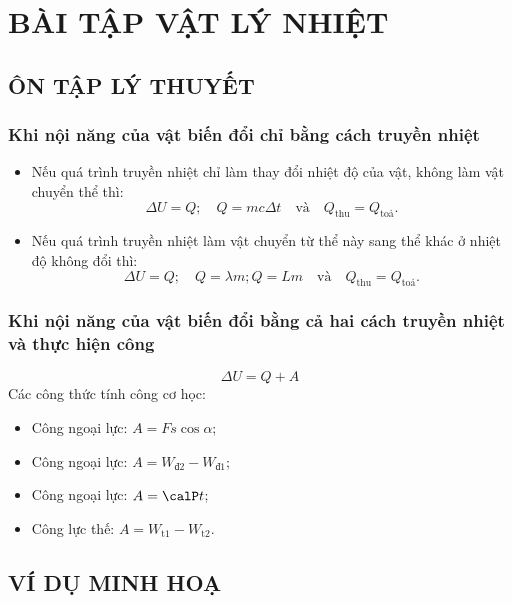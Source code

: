 \section{BÀI TẬP VẬT LÝ NHIỆT}
\subsection{ÔN TẬP LÝ THUYẾT}
\subsubsection{Khi nội năng của vật biến đổi chỉ bằng cách truyền nhiệt}
\begin{itemize}
	\item Nếu quá trình truyền nhiệt chỉ làm thay đổi nhiệt độ của vật, không làm vật chuyển thể thì:
	$$\Delta U=Q; \quad Q=mc\Delta t\quad \text{và}\quad Q_\text{thu}=Q_\text{toả}.$$
	\item Nếu quá trình truyền nhiệt làm vật chuyển từ thể này sang thể khác ở nhiệt độ không đổi thì:
	$$\Delta U=Q; \quad Q=\lambda m; Q=Lm \quad \text{và}\quad Q_\text{thu}=Q_\text{toả}.$$
\end{itemize}
\subsubsection{Khi nội năng của vật biến đổi bằng cả hai cách truyền nhiệt và thực hiện công}
$$\Delta U=Q+A$$
Các công thức tính công cơ học:
\begin{itemize}
	\item Công ngoại lực: $A=Fs\cos\alpha$;
	\item Công ngoại lực: $A=W_\text{đ2}-W_\text{đ1}$;
	\item Công ngoại lực:
	$A=\calP t$;
	\item Công lực thế: $A=W_\text{t1}-W_\text{t2}$.
\end{itemize}
\subsection{VÍ DỤ MINH HOẠ}



